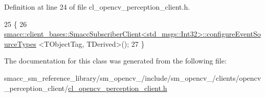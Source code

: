 Definition at line 24 of file cl\+\_\+opencv\+\_\+perception\+\_\+client.\+h.


\begin{DoxyCode}
25   \{
26     
      \hyperlink{classsmacc_1_1client__bases_1_1SmaccSubscriberClient}{smacc::client\_bases::SmaccSubscriberClient<std\_msgs::Int32>::configureEventSourceTypes}
      <TObjectTag, TDerived>();
27   \}
\end{DoxyCode}


The documentation for this class was generated from the following file\+:\begin{DoxyCompactItemize}
\item 
smacc\+\_\+sm\+\_\+reference\+\_\+library/sm\+\_\+opencv\+\_/include/sm\+\_\+opencv\+\_/clients/opencv\+\_\+perception\+\_\+client/\hyperlink{3_2include_2sm__opencv__3_2clients_2opencv__perception__client_2cl__opencv__perception__client_8h}{cl\+\_\+opencv\+\_\+perception\+\_\+client.\+h}\end{DoxyCompactItemize}
